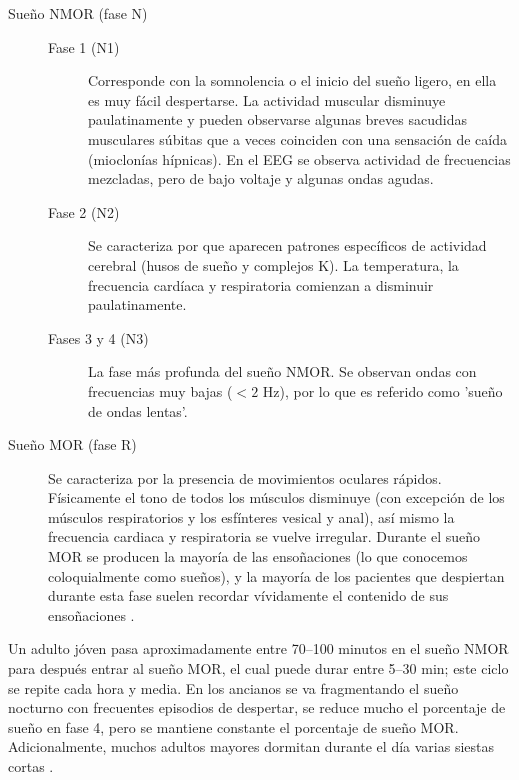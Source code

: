 \documentclass[12pt,a4paper]{mitthesis}
\begin{document}

\begin{description}
\item[Sue\~no NMOR (fase N)]

\begin{description}
\item[Fase 1 (N1)] Corresponde con la somnolencia o el inicio del sue\~no ligero, en ella es muy 
f\'acil despertarse. La actividad muscular disminuye paulatinamente y pueden observarse algunas 
breves sacudidas musculares s\'ubitas que a veces coinciden con una sensación de ca\'ida 
(mioclon\'ias h\'ipnicas). En el EEG se observa actividad de frecuencias mezcladas, pero de bajo 
voltaje y algunas ondas agudas. 

\item[Fase 2 (N2)] Se caracteriza por que aparecen patrones espec\'ificos de actividad 
cerebral (husos de sue\~no y complejos K). La temperatura, la frecuencia card\'iaca y respiratoria 
comienzan a disminuir paulatinamente. 

\item[Fases 3 y 4 (N3)] La fase m\'as profunda del sue\~no NMOR. Se observan ondas con frecuencias 
muy bajas ($<2$ Hz), por lo que es referido como 'sue\~no de ondas lentas'.
\end{description}
\item[Sueño MOR (fase R)] Se caracteriza por la presencia de movimientos oculares r\'apidos. F\'isicamente el tono de todos 
los m\'usculos disminuye (con excepción de los m\'usculos respiratorios y los esf\'interes vesical 
y anal), as\'i mismo la frecuencia cardiaca y respiratoria se vuelve irregular.%
Durante el sue\~no MOR se producen la mayor\'ia de las enso\~naciones (lo que conocemos 
coloquialmente como sue\~nos), y la mayor\'ia de los pacientes que despiertan durante esta fase 
suelen recordar v\'ividamente el contenido de sus enso\~naciones \cite{Chokroverty09}.
\end{description}

Un adulto j\'oven pasa aproximadamente entre 70--100 minutos en el sue\~no NMOR para despu\'es 
entrar al sue\~no MOR, el cual puede durar entre 5--30 min; este ciclo se repite cada hora y media.
En los ancianos se va fragmentando el sue\~no nocturno con frecuentes episodios de despertar, se 
reduce mucho el porcentaje de sue\~no en fase 4, pero se mantiene constante el porcentaje de 
sue\~no MOR. Adicionalmente, muchos adultos mayores dormitan durante el d\'ia varias siestas 
cortas \cite{CarrilloMora}.
\end{document}
